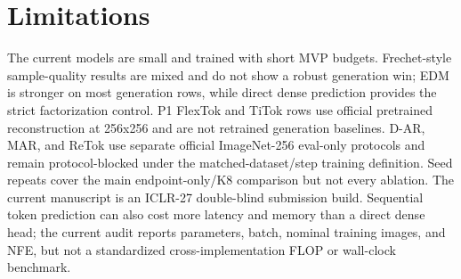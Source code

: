 \section{Limitations}

The current models are small and trained with short MVP budgets. Frechet-style
sample-quality results are mixed and do not show a robust \method{} generation
win; EDM is stronger on most generation rows, while direct dense prediction
provides the strict factorization control. P1 FlexTok and
TiTok rows use official pretrained reconstruction at 256x256 and are not
retrained generation baselines. D-AR, MAR, and ReTok use separate official
ImageNet-256 eval-only protocols and remain protocol-blocked under the
matched-dataset/step training definition. Seed repeats cover the main
endpoint-only/K8 comparison but not every ablation. The current manuscript is an
ICLR-27 double-blind submission build. Sequential token prediction can also
cost more latency and memory than a direct dense head; the current audit reports
parameters, batch, nominal training images, and NFE, but not a standardized
cross-implementation FLOP or wall-clock benchmark.
